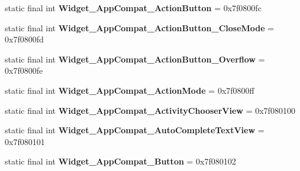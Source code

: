 \begin{DoxyCompactItemize}
\item 
\hypertarget{classandroid_1_1support_1_1design_1_1_r_1_1style_adc94449ee45cee4172348d277d2e978c}{}static final int {\bfseries Widget\+\_\+\+App\+Compat\+\_\+\+Action\+Button} = 0x7f0800fc\label{classandroid_1_1support_1_1design_1_1_r_1_1style_adc94449ee45cee4172348d277d2e978c}

\item 
\hypertarget{classandroid_1_1support_1_1design_1_1_r_1_1style_ac4892bc2668902d80f74ad423544b36f}{}static final int {\bfseries Widget\+\_\+\+App\+Compat\+\_\+\+Action\+Button\+\_\+\+Close\+Mode} = 0x7f0800fd\label{classandroid_1_1support_1_1design_1_1_r_1_1style_ac4892bc2668902d80f74ad423544b36f}

\item 
\hypertarget{classandroid_1_1support_1_1design_1_1_r_1_1style_a8eaafdb6030c487a3f7d67fd06e9323d}{}static final int {\bfseries Widget\+\_\+\+App\+Compat\+\_\+\+Action\+Button\+\_\+\+Overflow} = 0x7f0800fe\label{classandroid_1_1support_1_1design_1_1_r_1_1style_a8eaafdb6030c487a3f7d67fd06e9323d}

\item 
\hypertarget{classandroid_1_1support_1_1design_1_1_r_1_1style_ae00ca1a5ddcb0b444fe407053fda8398}{}static final int {\bfseries Widget\+\_\+\+App\+Compat\+\_\+\+Action\+Mode} = 0x7f0800ff\label{classandroid_1_1support_1_1design_1_1_r_1_1style_ae00ca1a5ddcb0b444fe407053fda8398}

\item 
\hypertarget{classandroid_1_1support_1_1design_1_1_r_1_1style_a5a00945d297c6b206b77513c61aa7584}{}static final int {\bfseries Widget\+\_\+\+App\+Compat\+\_\+\+Activity\+Chooser\+View} = 0x7f080100\label{classandroid_1_1support_1_1design_1_1_r_1_1style_a5a00945d297c6b206b77513c61aa7584}

\item 
\hypertarget{classandroid_1_1support_1_1design_1_1_r_1_1style_a59a59eff9a03b45874ac8f473383f081}{}static final int {\bfseries Widget\+\_\+\+App\+Compat\+\_\+\+Auto\+Complete\+Text\+View} = 0x7f080101\label{classandroid_1_1support_1_1design_1_1_r_1_1style_a59a59eff9a03b45874ac8f473383f081}

\item 
\hypertarget{classandroid_1_1support_1_1design_1_1_r_1_1style_ab5be18ddf0db368da54bf41e883e3f82}{}static final int {\bfseries Widget\+\_\+\+App\+Compat\+\_\+\+Button} = 0x7f080102\label{classandroid_1_1support_1_1design_1_1_r_1_1style_ab5be18ddf0db368da54bf41e883e3f82}


\end{DoxyCompactItemize}

